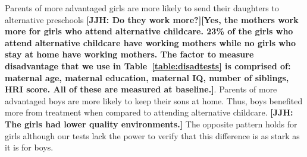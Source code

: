 Parents of more advantaged girls are more likely to send their daughters to alternative preschools \textbf{[JJH: Do they work more?][Yes, the mothers work more for girls who attend alternative childcare. 23\% of the girls who attend alternative childcare have working mothers while no girls who stay at home have working mothers. The factor to measure disadvantage that we use in Table~\ref{table:disadtests} is comprised of: maternal age, maternal education, maternal IQ, number of siblings, HRI score. All of these are measured at baseline.]}. Parents of more advantaged boys are more likely to keep their sons at home. Thus, boys benefited more from treatment when compared to attending alternative childcare. \textbf{[JJH: The girls had lower quality environments.]} The opposite pattern holds for girls although our tests lack the power to verify that this difference is as stark as it is for boys.











